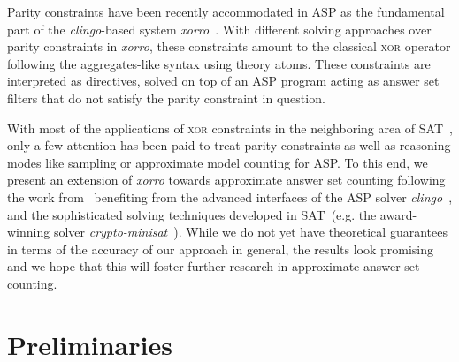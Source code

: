 \documentclass{article}
\newcommand{\XOR}{\textsc{xor}} %
\newcommand{\sysfont}{\textit}
\newcommand{\clingo}{\sysfont{clingo}}
\newcommand{\xorro}{\sysfont{xorro}}
\newcommand{\cryptominisat}{\sysfont{crypto-minisat}}
\begin{document}
Parity constraints have been recently accommodated in ASP
as the fundamental part of the \clingo{}-based system \xorro{}~\cite{DBLP:conf/lpnmr/EverardoJKS19}.
%
With different solving approaches over parity constraints in \xorro{}, these constraints amount to the classical \XOR{} operator following the aggregates-like syntax using theory atoms.
These constraints are interpreted as directives, solved on top of an ASP program acting as answer set filters that do not satisfy the parity constraint in question.
%



%
With most of the applications of \XOR{} constraints in the neighboring area of SAT~\cite{DBLP:journals/corr/abs-1806-02239},
only a few attention has been paid to treat parity constraints as well as reasoning modes like sampling or approximate model counting for ASP. %
%
To this end, we present an extension of \xorro{} towards approximate answer set counting following the work from~\cite{ChakrabortyMV13}
benefiting from the advanced interfaces of the ASP solver \clingo{}~\cite{DBLP:conf/iclp/GebserKKOSW16},
and the sophisticated solving techniques developed in SAT~(e.g. the award-winning solver \cryptominisat~\cite{DBLP:conf/sat/SoosNC09}).
%
While we do not yet have theoretical guarantees in terms of the accuracy of our approach in general,
the results look promising and we hope that this will foster further research in approximate answer set counting.
%

\section{Preliminaries}
\end{document}
